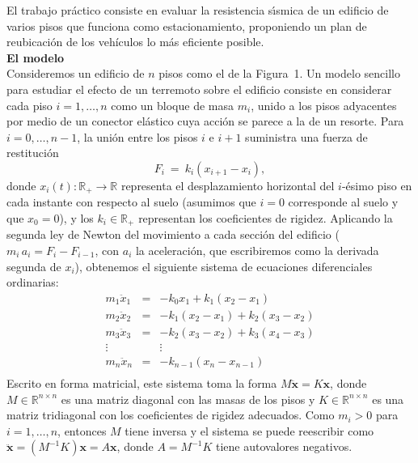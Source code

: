 \documentclass[a4paper]{article}
\begin{document}
El trabajo pr\'actico consiste en evaluar la resistencia s\'\i smica de un
edificio de varios pisos que funciona como estacionamiento, proponiendo un plan de
reubicaci\'on de los veh\'iculos lo m\'as eficiente posible.\\

\textbf{El modelo}\\
Consideremos un edificio de $n$ pisos como el de la Figura~1. Un modelo sencillo
para estudiar el efecto de un terremoto sobre el edificio consiste en
considerar cada piso $i=1,\dots,n$ como un bloque de masa $m_i$, unido a los
pisos adyacentes por medio de un conector el\'astico cuya acci\'on se parece
a la de un resorte. Para $i=0,\dots,n-1$, la uni\'on entre los pisos $i$ e
$i+1$ suministra una fuerza de restituci\'on
\begin{displaymath}
F_i\ =\ k_i (x_{i+1}-x_i),
\end{displaymath}
donde $x_i(t)\colon \mathbb{R}_+ \rightarrow \mathbb{R}$ representa el desplazamiento
horizontal del $i$-\'esimo piso en cada instante con respecto al suelo (asumimos que $i=0$ corresponde
al suelo y que $x_0=0$), y los $k_i\in\mathbb{R}_+$ representan los coeficientes
de rigidez. Aplicando la segunda ley de Newton del movimiento %
a cada secci\'on del edificio ($m_i\, a_i = F_i-F_{i-1}$, con $a_i$ la aceleraci\'on, que escribiremos como la derivada segunda de $x_i$), 
obtenemos el siguiente sistema de ecuaciones diferenciales ordinarias:
\begin{eqnarray*}
m_1 \ddot{x}_1 & = & -k_0 x_1 + k_1 (x_2-x_1) \nonumber \\
m_2 \ddot{x}_2 & = & -k_1 (x_2-x_1) + k_2 (x_3-x_2) \nonumber \\
m_3 \ddot{x}_3 & = & -k_2 (x_3-x_2) + k_3 (x_4-x_3) \nonumber \\
\vdots &  & \vdots \nonumber \\
m_n \ddot{x}_n & = & -k_{n-1} (x_n-x_{n-1}) \nonumber \\
\end{eqnarray*}
Escrito en forma matricial, este
sistema toma la forma $M\ddot{\mathbf{x}} = K\mathbf{x}$, 
donde $M\in\mathbb{R}^{n\times n}$ es una matriz
diagonal con las masas de los pisos y $K\in\mathbb{R}^{n\times n}$ es una matriz
tridiagonal con los coeficientes de rigidez adecuados. Como $m_i>0$ para
$i=1,\dots,n$, entonces $M$ tiene inversa y el sistema se puede reescribir
como $\ddot{\mathbf{x}} = (M^{-1} K) \mathbf{x} = A\mathbf{x}$, donde $A = M^{-1} K$ tiene autovalores negativos.
\end{document}
